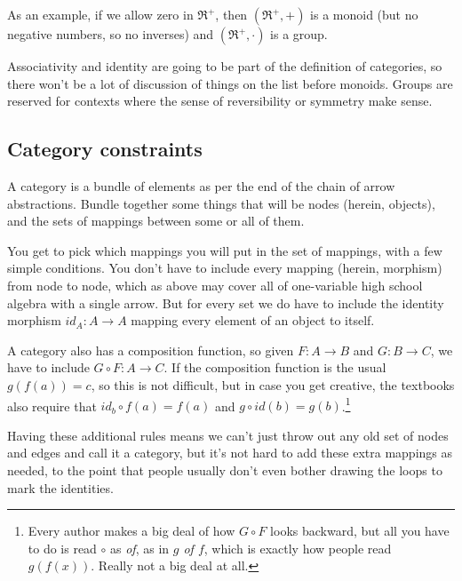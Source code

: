 \documentclass[11pt]{article}
\begin{document}

As an example, if we allow zero in $\Re^+$, then $(\Re^+, +)$ is a monoid (but no
negative numbers, so no inverses) and $(\Re^+, \cdot)$ is a group.

Associativity and identity are going to be part of the definition of categories,
so there won't be a lot of discussion of things on the list before monoids.
Groups are reserved for contexts where the sense of reversibility or symmetry make sense.

\subsection{Category constraints}
A category is a bundle of elements as per the end of the chain of arrow
abstractions. Bundle together some things that will be nodes (herein, objects), and
the sets of mappings between some or all of them.

You get to pick which mappings you will put in the set of mappings, with a few simple conditions.
You don't have to include every mapping (herein, morphism) from node to node, which as above may cover all of one-variable high school algebra with a single arrow. But for every set we do have to include
the identity morphism $id_A:A\to A$ mapping every element of an object to itself.

A category also has a composition function, so given $F:A\to B$
and $G:B\to C$, we have to include $G\circ F:A\to C$. If the composition function
is the usual $g(f(a)) = c$, so this is not difficult, but in case you get
creative, the textbooks also require that $id_b\circ f(a)=f(a)$ and $g\circ id(b)
= g(b)$.\footnote{Every author makes a big deal of how $G\circ F$ looks backward,
but all you have to do is read $\circ$ as {\em of}, as in {\em $g$ of $f$}, which is
exactly how people read $g(f(x))$. Really not a big deal at all.}

Having these additional rules means we can't just throw out any old set of nodes and edges
and call it a category, but it's not hard to add these extra mappings as needed,
to the point that people usually don't even bother drawing the loops to mark the
identities.
\end{document}
